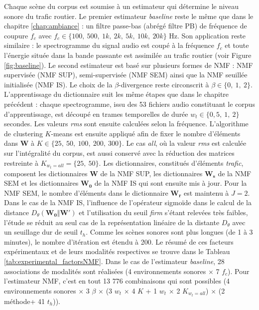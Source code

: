 Chaque scène du corpus est soumise à un estimateur qui détermine le niveau sonore du trafic routier. 
Le premier estimateur \textit{baseline} reste le même que dans le chapitre \ref{chap:ambiance} : un filtre passe-bas (abrégé filtre PB) de fréquence de coupure $f_c$ avec $f_c \in \lbrace 100,~500,~1k,~2k,~5k,~10k,~20k \rbrace$ Hz. Son application reste similaire : le spectrogramme du signal audio est coupé à la fréquence $f_c$ et toute l'énergie située dans la bande passante est assimilée au trafic routier (voir Figure \ref{fig:baseline}).
Le second estimateur est basé sur plusieurs formes de NMF : NMF supervisée (NMF SUP), semi-supervisée (NMF SEM) ainsi que la NMF seuillée initialisée (NMF IS). Le choix de la $\beta$-divergence reste circonscrit à $\beta \in \lbrace 0,~1,~2 \rbrace$.
L'apprentissage du dictionnaire suit les même étapes que dans le chapitre précédent : chaque spectrogramme, issu des 53 fichiers audio constituant le corpus d'apprentissage, est découpé en trames temporelles de durée $w_t \in \lbrace 0,5,~1,~2 \rbrace$ secondes. Les valeurs \textit{rms} sont ensuite calculées selon la fréquence. L'algorithme de clustering $K$-means est ensuite appliqué afin de fixer le nombre d'éléments dans $\mathbf{W}$ à $K \in \lbrace 25,~50,~100,~200,~ 300 \rbrace$. Le cas \textit{all}, où la valeur \textit{rms} est calculée sur l'intégralité du corpus, est aussi conservé avec la réduction des matrices restreinte à $K_{w_t = all} = \lbrace 25,~50 \rbrace$. Les dictionnaires, constitués d'éléments \textit{trafic}, composent les dictionnaires $\mathbf{W}$ de la NMF SUP, les dictionnaires $\mathbf{W_s}$ de la NMF SEM et les dictionnaires $\mathbf{W_0}$ de la NMF IS qui sont ensuite mis à jour.
Pour la NMF SEM, le nombre d'éléments dans le dictionnaire $\mathbf{W_r}$ est maintenu à $J = 2$.
Dans le cas de la NMF IS, l'influence de l'opérateur sigmoïde dans le calcul de la distance $D_{\theta}(\mathbf{W_0}\Vert \mathbf{W'})$ et l'utilisation du seuil \textit{firm} s'étant relevées très faibles, l'étude se réduit au seul cas de la représentation linéaire de la distante $D_{\theta}$ avec un seuillage dur de seuil $t_h$.
Comme les scènes sonores sont plus longues (de 1 à 3 minutes), le nombre d'itération est étendu à 200. 
Le résumé de ces facteurs expérimentaux et de leurs modalités respectives se trouve dans le Tableau \ref{tab:experimental_factorsNMF}. Dans le cas de l'estimateur \textit{baseline}, 28 associations de modalités sont réalisées (4 environnements sonores $\times$ 7 $f_c$). Pour l'estimateur NMF, c'est en tout 13 776 combinaisons qui sont possibles (4 environnements sonores $\times$ 3 $\beta$ $\times$ (3 $w_t$ $\times$ 4 $K$ + 1 $w_t$ $\times$ 2 $K_{w_t = all}$) $\times$ (2 méthode+ 41 $t_h$)).

